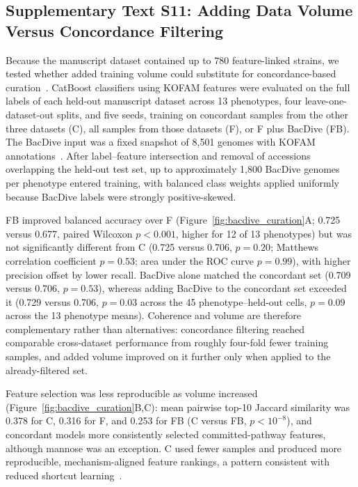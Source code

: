 \subsection*{Supplementary Text S11: Adding Data Volume Versus Concordance Filtering}

Because the manuscript dataset contained up to 780 feature-linked strains, we tested whether added training volume could substitute for concordance-based curation~\cite{Li2023-up,Yu2025BiasedSampling}.
CatBoost classifiers using KOFAM features were evaluated on the full labels of each held-out manuscript dataset across 13 phenotypes, four leave-one-dataset-out splits, and five seeds, training on concordant samples from the other three datasets (C), all samples from those datasets (F), or F plus BacDive (FB).
The BacDive input was a fixed snapshot of 8{,}501 genomes with KOFAM annotations~\cite{Schober2025BacDive}.
After label--feature intersection and removal of accessions overlapping the held-out test set, up to approximately 1{,}800 BacDive genomes per phenotype entered training, with balanced class weights applied uniformly because BacDive labels were strongly positive-skewed.

FB improved balanced accuracy over F (Figure~\ref{fig:bacdive_curation}A; 0.725 versus 0.677, paired Wilcoxon $p<0.001$, higher for 12 of 13 phenotypes) but was not significantly different from C (0.725 versus 0.706, $p=0.20$; Matthews correlation coefficient $p=0.53$; area under the ROC curve $p=0.99$), with higher precision offset by lower recall.
BacDive alone matched the concordant set (0.709 versus 0.706, $p=0.53$), whereas adding BacDive to the concordant set exceeded it (0.729 versus 0.706, $p=0.03$ across the 45 phenotype--held-out cells, $p=0.09$ across the 13 phenotype means).
Coherence and volume are therefore complementary rather than alternatives: concordance filtering reached comparable cross-dataset performance from roughly four-fold fewer training samples, and added volume improved on it further only when applied to the already-filtered set.

Feature selection was less reproducible as volume increased (Figure~\ref{fig:bacdive_curation}B,C): mean pairwise top-10 Jaccard similarity was 0.378 for C, 0.316 for F, and 0.253 for FB (C versus FB, $p<10^{-8}$), and concordant models more consistently selected committed-pathway features, although mannose was an exception.
C used fewer samples and produced more reproducible, mechanism-aligned feature rankings, a pattern consistent with reduced shortcut learning~\cite{Geirhos2020Shortcut}.

